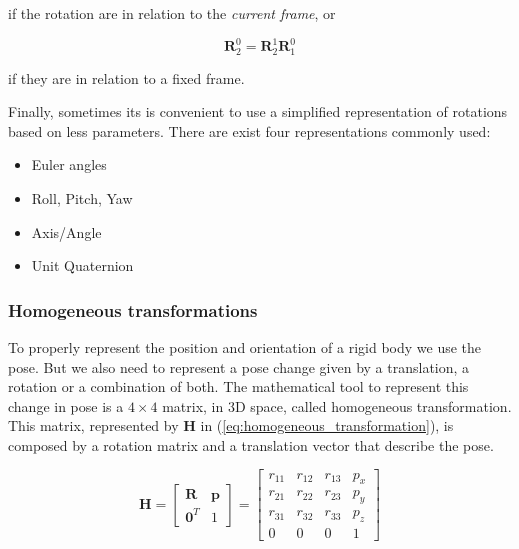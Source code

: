 if the rotation are in relation to the \emph{current frame}, or

\begin{equation}
    \boldsymbol{R}^{0}_{2} = \boldsymbol{R}^{1}_{2}\boldsymbol{R}^{0}_{1}
\end{equation}

if they are in relation to a fixed frame.

Finally, sometimes its is convenient to use a simplified representation of rotations based on less parameters. There are exist four representations commonly used:

\begin{itemize}
    \item Euler angles
    \item Roll, Pitch, Yaw
    \item Axis/Angle
    \item Unit Quaternion
\end{itemize}


\subsubsection{Homogeneous transformations}
\label{subsubsec:homogeneous_transformations}

To properly represent the position and orientation of a rigid body we use the pose. But we also need to represent a pose change given by a translation, a rotation or a combination of both. The mathematical tool to represent this change in pose is a $4\times4$ matrix, in 3D space, called homogeneous transformation. This matrix, represented by $\boldsymbol{H}$ in (\ref{eq:homogeneous_transformation}), is composed by a rotation matrix and a translation vector that describe the pose.

\begin{equation}
    \label{eq:homogeneous_transformation}
    \boldsymbol{H} = \begin{bmatrix} \boldsymbol{R} & \boldsymbol{p} \\ 
    \boldsymbol{0}^{T} & 1\end{bmatrix} = \begin{bmatrix} r_{11} & r_{12} & r_{13} & p_x\\
    r_{21} & r_{22} & r_{23} & p_y\\
    r_{31} & r_{32} & r_{33} & p_z\\
    0 & 0 & 0 & 1\end{bmatrix}
\end{equation}

